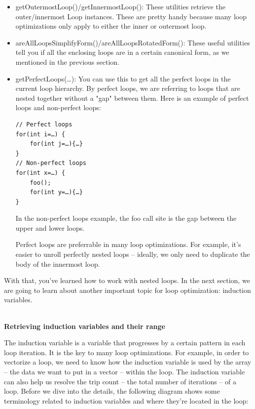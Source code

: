 \begin{itemize}
\item getOutermostLoop()/getInnermostLoop(): These utilities retrieve the outer/innermost Loop instances. These are pretty handy because many loop optimizations only apply to either the inner or outermost loop.

\item areAllLoopsSimplifyForm()/areAllLoopsRotatedForm(): These useful utilities tell you if all the enclosing loops are in a certain canonical form, as we mentioned in the previous section.

\item getPerfectLoops(…): You can use this to get all the perfect loops in the current loop hierarchy. By perfect loops, we are referring to loops that are nested together without a "gap" between them. Here is an example of perfect loops and non-perfect loops:

\begin{lstlisting}[style=styleCXX]
// Perfect loops
for(int i=…) {
	for(int j=…){…}
}
// Non-perfect loops
for(int x=…) {
	foo();
	for(int y=…){…}
}
\end{lstlisting}

In the non-perfect loops example, the foo call site is the gap between the upper and lower loops.

Perfect loops are preferrable in many loop optimizations. For example, it's easier to unroll perfectly nested loops – ideally, we only need to duplicate the body of the innermost loop.

\end{itemize}

With that, you've learned how to work with nested loops. In the next section, we are going to learn about another important topic for loop optimization: induction variables.

\hspace*{\fill} \\ %
\noindent
\textbf{Retrieving induction variables and their range}

The induction variable is a variable that progresses by a certain pattern in each loop iteration. It is the key to many loop optimizations. For example, in order to vectorize a loop, we need to know how the induction variable is used by the array – the data we want to put in a vector – within the loop. The induction variable can also help us resolve the trip count – the total number of iterations – of a loop. Before we dive into the details, the following diagram shows some terminology related to induction variables and where they're located in the loop:

